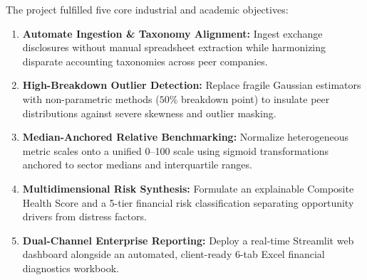 The project fulfilled five core industrial and academic objectives:
\begin{enumerate}
    \item \textbf{Automate Ingestion \& Taxonomy Alignment:} Ingest exchange disclosures without manual spreadsheet extraction while harmonizing disparate accounting taxonomies across peer companies.
    \item \textbf{High-Breakdown Outlier Detection:} Replace fragile Gaussian estimators with non-parametric methods ($50\%$ breakdown point) to insulate peer distributions against severe skewness and outlier masking.
    \item \textbf{Median-Anchored Relative Benchmarking:} Normalize heterogeneous metric scales onto a unified 0--100 scale using sigmoid transformations anchored to sector medians and interquartile ranges.
    \item \textbf{Multidimensional Risk Synthesis:} Formulate an explainable Composite Health Score and a 5-tier financial risk classification separating opportunity drivers from distress factors.
    \item \textbf{Dual-Channel Enterprise Reporting:} Deploy a real-time Streamlit web dashboard alongside an automated, client-ready 6-tab Excel financial diagnostics workbook.
\end{enumerate}
